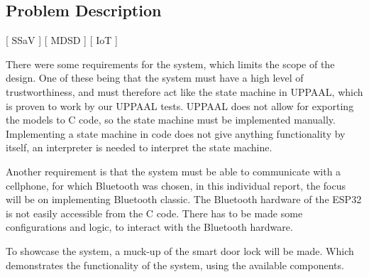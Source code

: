 \subsection{Problem Description}
[ SSaV ] [ MDSD ] [ IoT ] 
\newline


There were some requirements for the system, which limits the scope of the design.
One of these being that the system must have a high level of trustworthiness, and must therefore act like the state machine in UPPAAL, which is proven to work by our UPPAAL tests.
UPPAAL does not allow for exporting the models to C code, so the state machine must be implemented manually.
Implementing a state machine in code does not give anything functionality by itself, an interpreter is needed to interpret the state machine.

Another requirement is that the system must be able to communicate with a cellphone, for which Bluetooth was chosen, in this individual report, the focus will be on implementing Bluetooth classic.
The Bluetooth hardware of the ESP32 is not easily accessible from the C code.
There has to be made some configurations and logic, to interact with the Bluetooth hardware.

To showcase the system, a muck-up of the smart door lock will be made.
Which demonstrates the functionality of the system, using the available components.